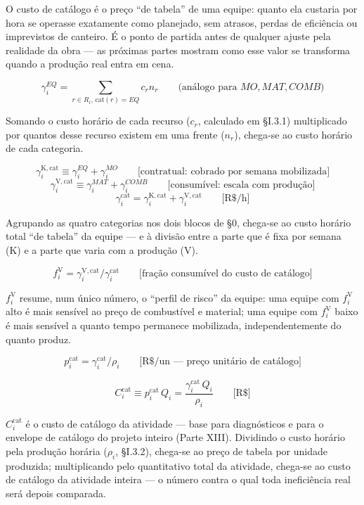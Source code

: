 \documentclass[
  10pt,
]{article}
\begin{document}
O custo de catálogo é o preço ``de tabela'' de uma equipe: quanto ela
custaria por hora se operasse exatamente como planejado, sem atrasos,
perdas de eficiência ou imprevistos de canteiro. É o ponto de partida
antes de qualquer ajuste pela realidade da obra --- as próximas partes
mostram como esse valor se transforma quando a produção real entra em
cena.

\[\gamma_i^{EQ} = \sum_{r\in R_i,\,\text{cat}(r)=EQ} c_r n_r \qquad \text{(análogo para } MO, MAT, COMB\text{)}\]

Somando o custo horário de cada recurso (\(c_r\), calculado em §I.3.1)
multiplicado por quantos desse recurso existem em uma frente (\(n_r\)),
chega-se ao custo horário de cada categoria.

\[\gamma_i^{\mathrm{K,cat}} \equiv \gamma_i^{EQ}+\gamma_i^{MO} \qquad\text{[contratual: cobrado por semana mobilizada]}\]
\[\gamma_i^{\mathrm{V,cat}} \equiv \gamma_i^{MAT}+\gamma_i^{COMB} \qquad\text{[consumível: escala com produção]}\]
\[\gamma_i^{\mathrm{cat}} = \gamma_i^{\mathrm{K,cat}}+\gamma_i^{\mathrm{V,cat}}\qquad\text{[R\$/h]}\]

Agrupando as quatro categorias nos dois blocos de §0, chega-se ao custo
horário total ``de tabela'' da equipe --- e à divisão entre a parte que
é fixa por semana (K) e a parte que varia com a produção (V).

\[f_i^{\mathrm V} = \gamma_i^{\mathrm{V,cat}}/\gamma_i^{\mathrm{cat}} \qquad\text{[fração consumível do custo de catálogo]}\]

\(f_i^{\mathrm V}\) resume, num único número, o ``perfil de risco'' da
equipe: uma equipe com \(f_i^{\mathrm V}\) alto é mais sensível ao preço
de combustível e material; uma equipe com \(f_i^{\mathrm V}\) baixo é
mais sensível a quanto tempo permanece mobilizada, independentemente do
quanto produz.

\[p_i^{\mathrm{cat}} = \gamma_i^{\mathrm{cat}}/\rho_i \qquad\text{[R\$/un — preço unitário de catálogo]}\]

\[\boxed{C_i^{\mathrm{cat}} \equiv p_i^{\mathrm{cat}}\,Q_i = \frac{\gamma_i^{\mathrm{cat}}\,Q_i}{\rho_i}}\qquad\text{[R\$]}\]

\(C_i^{\mathrm{cat}}\) é o custo de catálogo da atividade --- base para
diagnósticos e para o envelope de catálogo do projeto inteiro (Parte
XIII). Dividindo o custo horário pela produção horária (\(\rho_i\),
§I.3.2), chega-se ao preço de tabela por unidade produzida;
multiplicando pelo quantitativo total da atividade, chega-se ao custo de
catálogo da atividade inteira --- o número contra o qual toda
ineficiência real será depois comparada.
\end{document}
